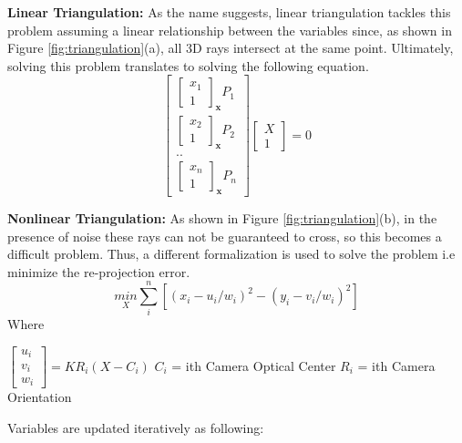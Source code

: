 \documentclass[11pt, a4paper, openany]{article}
\begin{document}
\begin{description}
\item \textbf{Linear Triangulation:} As the name suggests, linear triangulation tackles this problem assuming a linear relationship between the variables since, as shown in Figure \ref{fig:triangulation}(a), all 3D rays intersect at the same point. Ultimately, solving this problem translates to solving the following equation.
\begin{equation} \label{lintri}
\begin{bmatrix}
\begin{bmatrix}
x_{1}\\
1
\end{bmatrix}_{\textbf{x}} P_{1}\\
\begin{bmatrix}
x_{2}\\
1
\end{bmatrix}_{\textbf{x}} P_{2}\\
..\\
\begin{bmatrix}
x_{n}\\
1
\end{bmatrix}_{\textbf{x}} P_{n}
\end{bmatrix}
\begin{bmatrix}
X\\
1
\end{bmatrix}
 = 0
\end{equation}
\item \textbf{Nonlinear Triangulation:} As shown in Figure \ref{fig:triangulation}(b), in the presence of noise these rays can not be guaranteed to cross, so this becomes a difficult problem. Thus, a different formalization is used to solve the problem i.e minimize the re-projection error.
\begin{equation}\label{reprojerror}
\underset{X}{min} \sum_{i}^{n}[(x_{i}-u_{i}/w_{i})^{2}-(y_{i}-v_{i}/w_{i})^{2}]
\end{equation}
Where
\begin{center}
$\begin{bmatrix}
u_{i}\\
v_{i}\\
w_{i}
\end{bmatrix}
= KR_{i}(X-C_{i})$\newline
$C_{i}$ = ith Camera Optical Center \newline
$R_{i}$ = ith Camera Orientation\newline
\end{center}
Variables are updated iteratively as following:\newline

\end{description}
\end{document}

